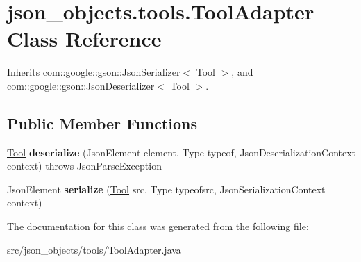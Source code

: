 \hypertarget{classjson__objects_1_1tools_1_1_tool_adapter}{
\section{json\_\-objects.tools.ToolAdapter Class Reference}
\label{classjson__objects_1_1tools_1_1_tool_adapter}
}


Inherits com::google::gson::JsonSerializer$<$ Tool $>$, and com::google::gson::JsonDeserializer$<$ Tool $>$.

\subsection*{Public Member Functions}
\begin{DoxyCompactItemize}
\item 
\hypertarget{classjson__objects_1_1tools_1_1_tool_adapter_af7f3baa151e4b5f6a6ba06a0d86db14f}{
\hyperlink{classjson__objects_1_1tools_1_1_tool}{Tool} {\bfseries deserialize} (JsonElement element, Type typeof, JsonDeserializationContext context)  throws JsonParseException }
\label{classjson__objects_1_1tools_1_1_tool_adapter_af7f3baa151e4b5f6a6ba06a0d86db14f}

\item 
\hypertarget{classjson__objects_1_1tools_1_1_tool_adapter_a9501290fdf428c63c7a415b2dd1fc0b0}{
JsonElement {\bfseries serialize} (\hyperlink{classjson__objects_1_1tools_1_1_tool}{Tool} src, Type typeofsrc, JsonSerializationContext context)}
\label{classjson__objects_1_1tools_1_1_tool_adapter_a9501290fdf428c63c7a415b2dd1fc0b0}

\end{DoxyCompactItemize}


The documentation for this class was generated from the following file:\begin{DoxyCompactItemize}
\item 
src/json\_\-objects/tools/ToolAdapter.java\end{DoxyCompactItemize}
